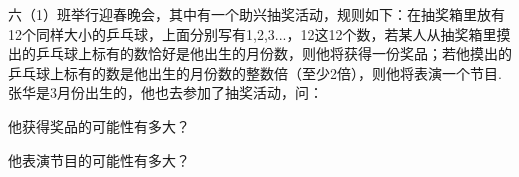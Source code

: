 六（1）班举行迎春晚会，其中有一个助兴抽奖活动，规则如下：在抽奖箱里放有12个同样大小的乒乓球，上面分别写有1,2,3...，12这12个数，若某人从抽奖箱里摸出的乒乓球上标有的数恰好是他出生的月份数，则他将获得一份奖品；若他摸出的乒乓球上标有的数是他出生的月份数的整数倍（至少2倍），则他将表演一个节目.张华是3月份出生的，他也去参加了抽奖活动，问：

\begin{subquestions}

    \subquestion 他获得奖品的可能性有多大？

    \subquestion 他表演节目的可能性有多大？

\end{subquestions}





